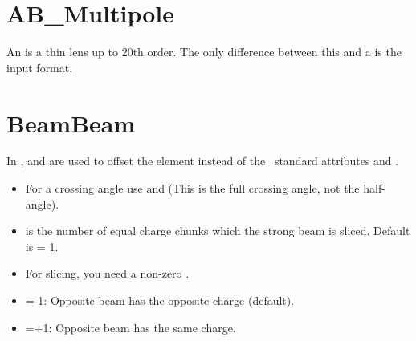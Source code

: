 \vfil
\break

\section{AB\_Multipole}
\label{s:ab_m}

An  is a thin lens up to 20th order. The only
difference between this and a  is the input format. 

\begin{table}[h]
\end{table}

\section{BeamBeam}
\label{s:bbi}


In \bmad,  and  are used to offset the
 element instead of the \mad\ standard attributes
 and .
\begin{itemize}
\item For a crossing angle use  and  (This is the full crossing angle,
not the half-angle).
\item {} is the number of equal charge chunks which the strong beam is sliced.
      Default is  = 1.
\item For slicing, you need a non-zero .
\item {}=-1: Opposite beam has the opposite charge (default).
\item {}=+1: Opposite beam has the same charge.   
\end{itemize}

